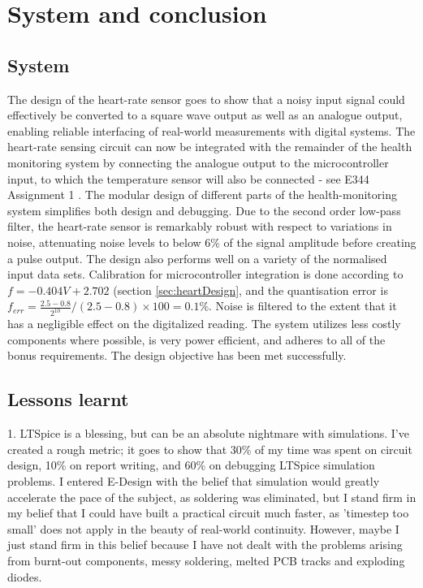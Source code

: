 \chapter{System and conclusion}
\vspace{-5mm}
\section{System}

The design of the heart-rate sensor goes to show that a noisy input signal could effectively be converted to a square wave output as well as an analogue output, enabling reliable interfacing of real-world measurements with digital systems. The heart-rate sensing circuit can now be integrated with the remainder of the health monitoring system by connecting the analogue output to the microcontroller input, to which the temperature sensor will also be connected - see E344 Assignment 1 \cite{prev}. The modular design of different parts of the health-monitoring system simplifies both design and debugging. Due to the second order low-pass filter, the heart-rate sensor is remarkably robust with respect to variations in noise, attenuating noise levels to below 6\% of the signal amplitude before creating a pulse output. The design also performs well on a variety of the normalised input data sets. Calibration for microcontroller integration is done according to $f = -0.404V + 2.702$ (section \ref{sec:heartDesign}, and the quantisation error is $f_{err} = \frac{2.5 - 0.8}{2^{10}} / (2.5 - 0.8) \times 100 = 0.1\%$. Noise is filtered to the extent that it has a negligible effect on the digitalized reading.
The system utilizes less costly components where possible, is very power efficient, and adheres to all of the bonus requirements. The design objective has been met successfully.

\section{Lessons learnt}
1. LTSpice is a blessing, but can be an absolute nightmare with simulations. I've created a rough metric; it goes to show that 30\% of my time was spent on circuit design, 10\% on report writing, and 60\% on debugging LTSpice simulation problems. I entered E-Design with the belief that simulation would greatly accelerate the pace of the subject, as soldering was eliminated, but I stand firm in my belief that I could have built a practical circuit much faster, as 'timestep too small' does not apply in the beauty of real-world continuity. However, maybe I just stand firm in this belief because I have not dealt with the problems arising from burnt-out components, messy soldering, melted PCB tracks and exploding diodes.

